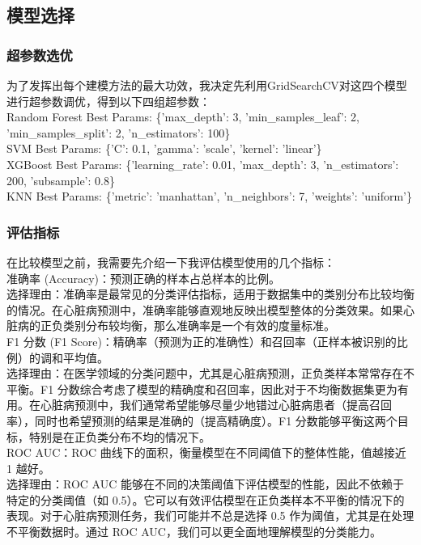 \documentclass[UTF8]{article}
\begin{document}
	\subsection{模型选择}
	\subsubsection{超参数选优}
	为了发挥出每个建模方法的最大功效，我决定先利用GridSearchCV对这四个模型进行超参数调优，得到以下四组超参数：\\
	Random Forest Best Params: \{'max\_depth': 3, 'min\_samples\_leaf': 2, 'min\_samples\_split': 2, 'n\_estimators': 100\}\\
	SVM Best Params: \{'C': 0.1, 'gamma': 'scale', 'kernel': 'linear'\}\\
	XGBoost Best Params: \{'learning\_rate': 0.01, 'max\_depth': 3, 'n\_estimators': 200, 'subsample': 0.8\}\\
	KNN Best Params: \{'metric': 'manhattan', 'n\_neighbors': 7, 'weights': 'uniform'\}
	\subsubsection{评估指标}
	在比较模型之前，我需要先介绍一下我评估模型使用的几个指标：\\
	\noindent 准确率 (Accuracy)：预测正确的样本占总样本的比例。\\
	选择理由：准确率是最常见的分类评估指标，适用于数据集中的类别分布比较均衡的情况。在心脏病预测中，准确率能够直观地反映出模型整体的分类效果。如果心脏病的正负类别分布较均衡，那么准确率是一个有效的度量标准。\\
	
\noindent F1 分数 (F1 Score)：精确率（预测为正的准确性）和召回率（正样本被识别的比例）的调和平均值。\\
	选择理由：在医学领域的分类问题中，尤其是心脏病预测，正负类样本常常存在不平衡。F1 分数综合考虑了模型的精确度和召回率，因此对于不均衡数据集更为有用。在心脏病预测中，我们通常希望能够尽量少地错过心脏病患者（提高召回率），同时也希望预测的结果是准确的（提高精确度）。F1 分数能够平衡这两个目标，特别是在正负类分布不均的情况下。\\
	
	\noindent ROC AUC：ROC 曲线下的面积，衡量模型在不同阈值下的整体性能，值越接近 1 越好。\\
	选择理由：ROC AUC 能够在不同的决策阈值下评估模型的性能，因此不依赖于特定的分类阈值（如 0.5）。它可以有效评估模型在正负类样本不平衡的情况下的表现。对于心脏病预测任务，我们可能并不总是选择 0.5 作为阈值，尤其是在处理不平衡数据时。通过 ROC AUC，我们可以更全面地理解模型的分类能力。
\end{document}
